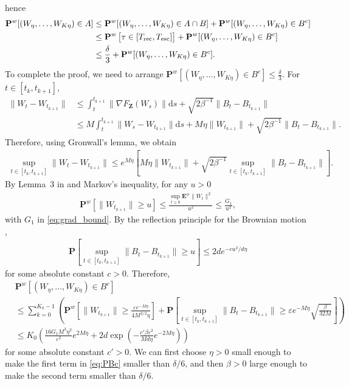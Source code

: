 \documentclass[final,12pt]{colt2018}
\numberwithin{equation}{section}
\numberwithin{equation}{section}
\def\E{\mathbf{E}}
\def\PP{\mathbf{P}}
\def\bd#1{\mathbf{#1}}
\def\bZ{\bd{Z}}
\def\d{{\mathrm d}}
\def\eps{\varepsilon}
\begin{document}
hence
\begin{align*}
	\PP^w[(W_\eta,\ldots,W_{K\eta}) \in A] &\le \PP^w[(W_\eta,\ldots,W_{K\eta}) \in A \cap B] + \PP^w[(W_\eta,\ldots,W_{K\eta}) \in B^c] \\
	&\le \PP^w\left[ \tau \in [T_{\rm rec}, T_{\rm esc}]\right] + \PP^w[(W_\eta,\ldots,W_{K\eta}) \in B^c] \\
	&\le \frac{\delta}{3} + \PP^w[(W_\eta,\ldots,W_{K\eta}) \in B^c].
\end{align*}
To complete the proof, we need to arrange  $\PP^w[(W_\eta,\ldots,W_{K\eta}) \in B^c] \le \frac{\delta}{3}$. For $t \in [t_k,t_{k+1}]$,
\begin{align*}
	\|W_t - W_{t_{k+1}}\| &\le \int^{t_{k+1}}_t \| \nabla F_\bZ(W_s)\| \d s + \sqrt{2\beta^{-1}} \|B_t - B_{t_{k+1}}\| \\
	&\le M\int^{t_{k+1}}_t \|W_s - W_{t_{k+1}}\|\d s + M\eta\|W_{t_{k+1}}\| + \sqrt{2\beta^{-1}}\|B_t - B_{t_{k+1}}\|.
\end{align*}
Therefore, using Gronwall's lemma, we obtain
\begin{align*}
	\sup_{t \in [t_k,t_{k+1}]} \|W_t - W_{t_{k+1}}\| \le e^{M\eta}\left[M\eta \|W_{t_{k+1}}\| + \sqrt{2\beta^{-1}}\sup_{t \in [t_k,t_{k+1}]}\|B_t - B_{t_{k+1}}\|\right].
\end{align*}
By Lemma~3 in \cite*{rrt_colt17} and Markov's inequality, for any $u > 0$
\begin{align}\label{eq:Markov_term}
	\PP^w\left[\|W_{t_{k+1}}\| \ge u \right] \le \frac{\sup_{t \ge 0}\E^w\|W_t\|^2}{u^2} \le \frac{G_1}{u^2},
\end{align}
with $G_1$ in \eqref{eq:grad_bound}. By the reflection principle for the Brownian motion \citep{morters2010brownian},
\begin{align}
	\PP\left[ \sup_{t \in [t_k,t_{k+1}]} \|B_t - B_{t_{k+1}}\| \ge u \right] \le 2de^{-cu^2/d\eta}
\end{align}
for some absolute constant $c > 0$. Therefore,
\begin{align}
&	\PP^w[(W_\eta,\ldots,W_{K\eta}) \in B^c] \nonumber\\
&\le \sum^{K_0-1}_{k=0} \left(\PP^w\left[ \|W_{t_{k+1}}\| \ge \frac{\eps e^{-M\eta}}{4M^{3/2}\eta} \right] + \PP\left[\sup_{t \in [t_k,t_{k+1}]} \|B_t - B_{t_{k+1}}\| \ge \eps e^{-M\eta}\sqrt{\frac{\beta}{32M}}\right]\right) \nonumber\\
	&\le K_0 \left( \frac{16G_1M^3\eta^2}{\eps^2} e^{2M\eta} + 2d \exp\left(-\frac{c'\beta\eps^2}{Md\eta}e^{-2M\eta}\right) \right)\label{eq:PBc}
\end{align}
for some absolute constant $c' > 0$. We can first choose $\eta > 0$ small enough to make the first term in \eqref{eq:PBc} smaller than $\delta/6$, and then $\beta > 0$ large enough to make the second term smaller than $\delta/6$.
\end{document}
